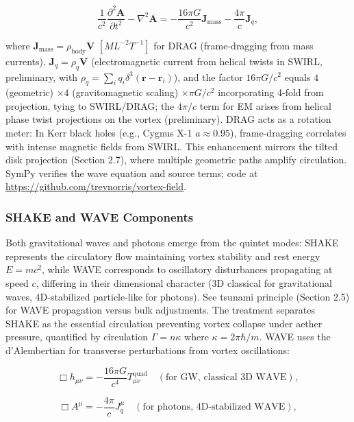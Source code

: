 \begin{equation}
\frac{1}{c^2} \frac{\partial^2 \mathbf{A}}{\partial t^2} - \nabla^2 \mathbf{A} = -\frac{16\pi G}{c^2} \mathbf{J}_{\text{mass}} - \frac{4\pi}{c} \mathbf{J}_q,
\end{equation}

where $\mathbf{J}_{\text{mass}} = \rho_{\text{body}} \mathbf{V}$ $[M L^{-2} T^{-1}]$ for DRAG (frame-dragging from mass currents), $\mathbf{J}_q = \rho_q \mathbf{V}$ (electromagnetic current from helical twists in SWIRL, preliminary, with $\rho_q = \sum_i q_i \delta^3(\mathbf{r} - \mathbf{r}_i)$), and the factor $16\pi G/c^2$ equals $4$ (geometric) $\times 4$ (gravitomagnetic scaling) $\times \pi G/c^2$ incorporating 4-fold from projection, tying to SWIRL/DRAG; the $4\pi/c$ term for EM arises from helical phase twist projections on the vortex (preliminary). DRAG acts as a rotation meter: In Kerr black holes (e.g., Cygnus X-1 $a\approx0.95$), frame-dragging correlates with intense magnetic fields from SWIRL. This enhancement mirrors the tilted disk projection (Section 2.7), where multiple geometric paths amplify circulation. SymPy verifies the wave equation and source terms; code at \url{https://github.com/trevnorris/vortex-field}.

\subsubsection{SHAKE and WAVE Components}

Both gravitational waves and photons emerge from the quintet modes: SHAKE represents the circulatory flow maintaining vortex stability and rest energy $E = m c^2$, while WAVE corresponds to oscillatory disturbances propagating at speed $c$, differing in their dimensional character (3D classical for gravitational waves, 4D-stabilized particle-like for photons). See tsunami principle (Section 2.5) for WAVE propagation versus bulk adjustments. The treatment separates SHAKE as the essential circulation preventing vortex collapse under aether pressure, quantified by circulation $\Gamma = n \kappa$ where $\kappa = 2 \pi \hbar / m$. WAVE uses the d'Alembertian for transverse perturbations from vortex oscillations:

\begin{equation}
\Box h_{\mu\nu} = -\frac{16\pi G}{c^4} T_{\mu\nu}^{\text{quad}} \quad (\text{for GW, classical 3D WAVE}),
\end{equation}

\begin{equation}
\Box A^\mu = -\frac{4\pi}{c} J_q^\mu \quad (\text{for photons, 4D-stabilized WAVE}),
\end{equation}

